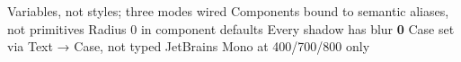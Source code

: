 \documentclass[fontpath=fonts/,logopath=logo/]{riposte-doc}
\begin{document}

\begin{riptodolist}
\riptodo Variables, not styles; three modes wired
\riptodo Components bound to semantic aliases, not primitives
\riptodo Radius 0 in component defaults
\riptodo Every shadow has blur \textbf{0}
\riptodo Case set via Text → Case, not typed
\riptodo JetBrains Mono at 400/700/800 only
\end{riptodolist}

\ripend
\end{document}
